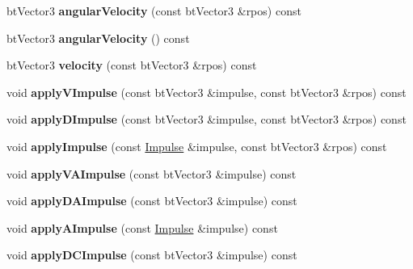 \begin{DoxyCompactItemize}
\item 
\hypertarget{structbt_soft_body_1_1_body_a43a3a10af1c4063bc777e9be3fa39b70}{bt\+Vector3 {\bfseries angular\+Velocity} (const bt\+Vector3 \&rpos) const }\label{structbt_soft_body_1_1_body_a43a3a10af1c4063bc777e9be3fa39b70}

\item 
\hypertarget{structbt_soft_body_1_1_body_a288c3486817f6a0e68df99fbe6112520}{bt\+Vector3 {\bfseries angular\+Velocity} () const }\label{structbt_soft_body_1_1_body_a288c3486817f6a0e68df99fbe6112520}

\item 
\hypertarget{structbt_soft_body_1_1_body_a00410a38f7a47cd2e0af3a7a46a3eb3c}{bt\+Vector3 {\bfseries velocity} (const bt\+Vector3 \&rpos) const }\label{structbt_soft_body_1_1_body_a00410a38f7a47cd2e0af3a7a46a3eb3c}

\item 
\hypertarget{structbt_soft_body_1_1_body_a206a2141a8c3603395e5690eaafe4ae9}{void {\bfseries apply\+V\+Impulse} (const bt\+Vector3 \&impulse, const bt\+Vector3 \&rpos) const }\label{structbt_soft_body_1_1_body_a206a2141a8c3603395e5690eaafe4ae9}

\item 
\hypertarget{structbt_soft_body_1_1_body_af6ac3a84f27138ab747bc65bc475ab7e}{void {\bfseries apply\+D\+Impulse} (const bt\+Vector3 \&impulse, const bt\+Vector3 \&rpos) const }\label{structbt_soft_body_1_1_body_af6ac3a84f27138ab747bc65bc475ab7e}

\item 
\hypertarget{structbt_soft_body_1_1_body_ac27a5e66ed47608669d06e6451526f28}{void {\bfseries apply\+Impulse} (const \hyperlink{structbt_soft_body_1_1_impulse}{Impulse} \&impulse, const bt\+Vector3 \&rpos) const }\label{structbt_soft_body_1_1_body_ac27a5e66ed47608669d06e6451526f28}

\item 
\hypertarget{structbt_soft_body_1_1_body_abf5ba22bc1d206f0affd781dc68de436}{void {\bfseries apply\+V\+A\+Impulse} (const bt\+Vector3 \&impulse) const }\label{structbt_soft_body_1_1_body_abf5ba22bc1d206f0affd781dc68de436}

\item 
\hypertarget{structbt_soft_body_1_1_body_a6428557dd911b134901c910539055b3f}{void {\bfseries apply\+D\+A\+Impulse} (const bt\+Vector3 \&impulse) const }\label{structbt_soft_body_1_1_body_a6428557dd911b134901c910539055b3f}

\item 
\hypertarget{structbt_soft_body_1_1_body_ade2cb45faee3a979f9d2bfc3aa23fc5e}{void {\bfseries apply\+A\+Impulse} (const \hyperlink{structbt_soft_body_1_1_impulse}{Impulse} \&impulse) const }\label{structbt_soft_body_1_1_body_ade2cb45faee3a979f9d2bfc3aa23fc5e}

\item 
\hypertarget{structbt_soft_body_1_1_body_a9512ff7dfa4ff7e4c63455ede739791a}{void {\bfseries apply\+D\+C\+Impulse} (const bt\+Vector3 \&impulse) const }\label{structbt_soft_body_1_1_body_a9512ff7dfa4ff7e4c63455ede739791a}

\end{DoxyCompactItemize}
